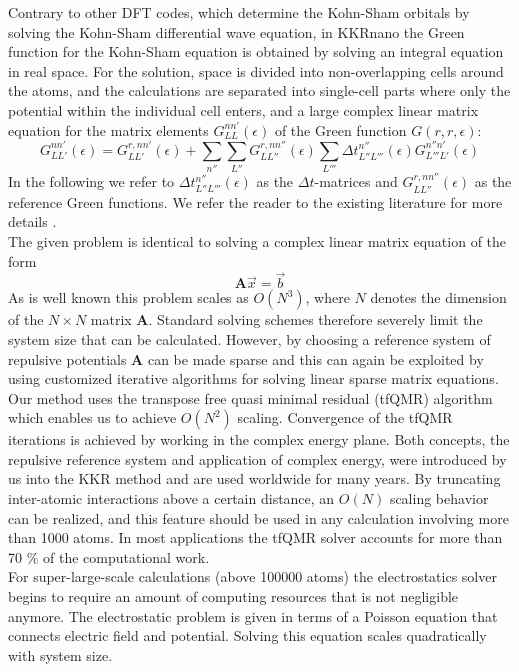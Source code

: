 \documentclass [a4paper, 12pt]{article}
\newcommand{\matr}[1]{\bm{#1}}
\begin{document}
Contrary to other DFT codes, which determine the Kohn-Sham orbitals by solving
the Kohn-Sham differential wave equation, in KKRnano the Green function for the Kohn-Sham
equation is obtained by solving an integral equation in real space. For the solution, space is divided
into non-overlapping cells around the atoms, and the calculations are separated into single-cell parts
where only the potential within the individual cell enters, and a large complex linear matrix equation for 
the matrix elements $G_{LL}^{nn'} (\epsilon)$ of the Green function $G(r, r , \epsilon)$:
\begin{equation}
	G_{LL'}^{nn'} (\epsilon) = G_{LL'}^{r,nn'} (\epsilon) + \sum_{n''} \sum_{L''}
	G_{LL''}^{r,nn''} (\epsilon) \sum_{L'''} \Delta t_{L'' L'''}^{n''} (\epsilon)
	G_{L'''L'}^{n''n'} (\epsilon)
	\label{eq:dyson_eq}
\end{equation}
In the following we refer to $\Delta t_{L'' L'''}^{n''} (\epsilon)$ as the $\Delta t$-matrices and
$G_{LL''}^{r,nn''} (\epsilon)$ as the reference Green functions. We refer the reader to the existing
literature for more details \cite{zeller_towards_2008}.
\\
The given problem is identical to solving a complex linear matrix equation of the form
\begin{equation}
	\matr{A} \vec{x} = \vec{b}
\end{equation}
As is well known this problem scales as $O(N^3)$, where $N$ denotes the dimension of the $N \times N$
matrix $\matr{A}$. Standard solving schemes therefore severely limit the system size that can
be calculated.
However, by choosing a reference system of repulsive potentials
$\matr{A}$ can be made sparse and this can again be exploited
by using customized iterative algorithms for solving linear sparse matrix equations.
Our method uses the transpose free quasi minimal residual (tfQMR) algorithm \cite{freund_qmr:_1991}
which enables us to achieve $O(N^2)$ scaling. 
Convergence of the tfQMR iterations is achieved by working in the complex energy plane. Both concepts,
the repulsive reference system and application of complex energy, were
introduced by us into the KKR method \cite{zeller_application_1982,zeller_theory_1995}
and are used worldwide for many years. 
By truncating inter-atomic interactions above a certain distance, an $O(N)$ scaling 
behavior can be realized, and this feature should be used in any calculation involving more than 1000 atoms.
In most applications the tfQMR solver accounts for more than 70 \% of the computational work.
\\
For super-large-scale calculations (above 100000 atoms) the electrostatics solver begins
to require an amount of computing resources that is not negligible anymore. 
The electrostatic problem is given in terms of a Poisson equation that connects electric field and potential. 
Solving this equation scales quadratically with system size. 
\end{document}
